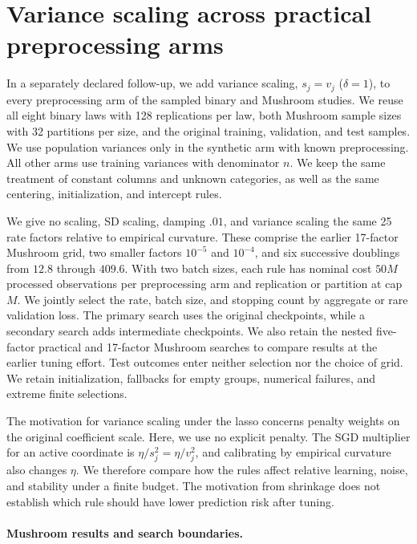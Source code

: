 \section{Variance scaling across practical preprocessing arms}
\label{sec:variance-scaling-followup}

In a separately declared follow-up, we add variance scaling, $s_j = v_j$
($\delta = 1$), to every preprocessing arm of the sampled binary and Mushroom
studies. We reuse all eight binary laws with 128 replications per law, both
Mushroom sample sizes with 32 partitions per size, and the original training,
validation, and test samples. We use population variances only in the synthetic
arm with known preprocessing. All other arms use training variances with
denominator $n$. We keep the same treatment of constant columns and unknown
categories, as well as the same centering, initialization, and intercept rules.

We give no scaling, SD scaling, damping $.01$, and variance scaling the same
25 rate factors relative to empirical curvature. These comprise the earlier
17-factor Mushroom grid, two smaller factors $10^{-5}$ and $10^{-4}$, and six
successive doublings from $12.8$ through $409.6$. With two batch sizes, each
rule has nominal cost $50M$ processed observations per preprocessing arm and
replication or partition at cap $M$. We jointly select the rate, batch size, and stopping
count by aggregate or rare validation loss. The primary search uses the original
checkpoints, while a secondary search adds intermediate checkpoints. We also
retain the nested five-factor practical and 17-factor Mushroom searches to
compare results at the earlier tuning effort. Test outcomes enter neither
selection nor the choice of grid. We retain initialization, fallbacks for empty
groups, numerical failures, and extreme finite selections.

The motivation for variance scaling under the lasso concerns penalty weights on
the original coefficient scale. Here, we use no explicit penalty. The SGD
multiplier for an active coordinate is $\eta/s_j^2 = \eta/v_j^2$, and
calibrating by empirical curvature also changes $\eta$. We therefore compare
how the rules affect relative learning, noise, and stability under a finite
budget. The motivation from shrinkage does not establish which rule should have
lower prediction risk after tuning.

\paragraph{Mushroom results and search boundaries.}

